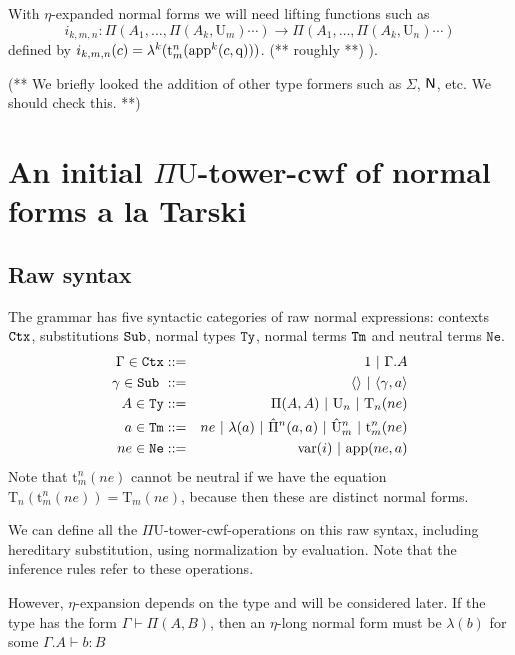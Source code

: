 \documentclass{lmcs}
\def\UU{\mathrm{U}}
\def\Ta{\mathrm{T}}
\def\Pihat{\hat{\Pi}}
\def\UUhat{\hat{\UU}}
\def\t{\mathrm{t}}
\def\RawNe{\texttt{Ne}}
\def\var{\mathrm{var}}
\def\q{\mathrm{q}}
\begin{document}
With $\eta$-expanded normal forms we will need lifting functions such as
$$
i_{k,m,n} : \Pi(A_1,\ldots, \Pi(A_k,\UU_m)\cdots)\to \Pi(A_1,\ldots, \Pi(A_k,\UU_n)\cdots)
$$
defined by $i_{k,m,n}(c)  = \lambda^k(\t^n_m(\ap^k(c,\q)))$. (** roughly **) ).

(** We briefly looked the addition of other type formers such as $\Sigma$, $\mathsf{N}$, etc. We should check this. **)

\section{An initial $\Pi\UU$-tower-cwf of normal forms a la Tarski}
\label{sec:syntax}


\subsection{Raw syntax}\label{sec:grammar}

The grammar has five syntactic categories of raw normal expressions: contexts ${\tt Ctx}$,
substitutions ${\tt Sub}$, normal types ${\tt Ty}$, normal terms ${\tt Tm}$ and neutral terms $\RawNe$.
\begin{eqnarray*}
\Gamma \in \RawCtx &::=& 1  \ |\ \Gamma.A\\
\gamma \in \RawSub \ &::=&  \langle\rangle \ |\ \langle \gamma, a \rangle\\
A \in \RawTy &::=& \Pi(A,A)\ |\  \UU_{n} \ |\ \Ta_n(ne) \\ 
a \in \RawTm &::=& ne \ |\  \lambda(a)\ |\ \Pihat^n(a,a)\ |\ \UUhat^n_m \ |\  \t^n_m(ne) \\
ne \in \RawNe &::=& \var(i)  \ |\  \ap(ne,a)
\end{eqnarray*}
Note that $\t^n_m(ne)$ cannot be neutral if we have the equation $\Ta_{n}(\t^n_m(ne)) = \Ta_m(ne)$, because then these are distinct normal forms.

We can define all the $\Pi\UU$-tower-cwf-operations on this raw syntax, including hereditary substitution, using normalization by evaluation. Note that the inference rules refer to these operations.

However, $\eta$-expansion depends on the type and will be considered later. If the type has the form $\Gamma \vdash \Pi(A,B)$, then an $\eta$-long normal form must be $\lambda(b)$ for some $\Gamma.A \vdash b : B$
\end{document}
